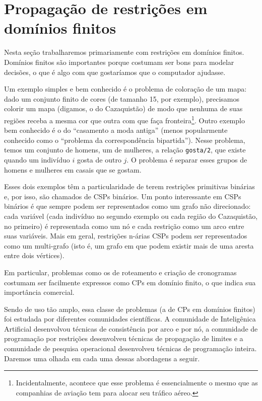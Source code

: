 \documentclass{article}
\begin{document}
\section{Propagação de restrições em domínios finitos}

Nesta seção trabalharemos primariamente com restrições em domínios finitos.
Domínios finitos são importantes porque costumam ser bons para modelar
decisões, o que é algo com que gostaríamos que o computador ajudasse.

Um exemplo simples e bem conhecido é o problema de coloração de um mapa: dado um conjunto finito de cores (de tamanho 15, por exemplo), precisamos colorir um mapa (digamos, o do Cazaquistão) de modo que nenhuma de suas regiões receba a mesma cor que outra com que faça fronteira\footnote{Incidentalmente, acontece que esse problema é essencialmente o mesmo que as companhias de aviação tem para alocar seu tráfico aéreo.}.
Outro exemplo bem conhecido é o do ``casamento a moda antiga'' (menos popularmente conhecido como o ``problema da correspondência bipartida'').
Nesse problema, temos um conjunto de homens, um de mulheres, a relação {\tt gosta/2}, que existe quando um indivíduo $i$ gosta de outro $j$.
O problema é separar esses grupos de homens e mulheres em casais que se gostam.

Esses dois exemplos têm a particularidade de terem restrições primitivas binárias e, por isso, são chamados de CSPs binários. Um ponto interessante em CSPs binários é que sempre podem ser representados como um grafo não direcionado:
  cada variável (cada indivíduo no segundo exemplo ou cada região do Cazaquistão, no primeiro) é representada como um nó e cada restrição como um arco entre suas variáveis. Mais em geral, restrições n-árias CSPs podem ser representados como um multi-grafo (isto é, um grafo em que podem existir mais de uma aresta entre dois vértices).

  Em particular, problemas como os de roteamento e criação de cronogramas
  costumam ser facilmente expressos como CPs em domínio finito, o que indica sua importância comercial.

  Sendo de uso tão amplo, essa classe de problemas (a de CPs em domínios finitos) foi estudada por diferentes comunidades
científicas. A comunidade de Inteligênica Artificial desenvolvou técnicas de consistência por arco e por nó, a
comunidade de programação por restrições desenvolveu técnicas de propagação de limites e a comunidade de pesquisa
operacional desenvolveu técnicas de programação inteira. Daremos uma olhada em cada uma dessas abordagens a seguir.
\end{document}
